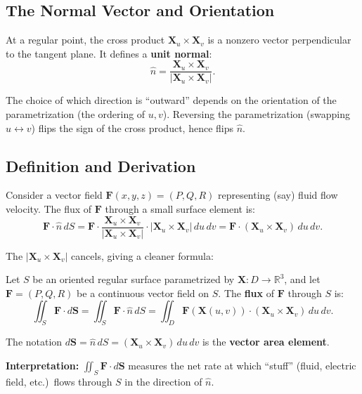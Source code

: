\documentclass[11pt]{report}
\newcommand{\R}{\mathbb{R}}
\begin{document}
\subsection*{The Normal Vector and Orientation}

At a regular point, the cross product $\mathbf{X}_u \times \mathbf{X}_v$ is a nonzero vector perpendicular to the tangent plane. It defines a \textbf{unit normal}:
\[
\hat{n} = \frac{\mathbf{X}_u \times \mathbf{X}_v}{|\mathbf{X}_u \times \mathbf{X}_v|}.
\]

The choice of which direction is ``outward'' depends on the orientation of the parametrization (the ordering of $u, v$). Reversing the parametrization (swapping $u \leftrightarrow v$) flips the sign of the cross product, hence flips $\hat{n}$.

\subsection*{Definition and Derivation}

Consider a vector field $\mathbf{F}(x,y,z) = (P, Q, R)$ representing (say) fluid flow velocity. The flux of $\mathbf{F}$ through a small surface element is:
\[
\mathbf{F} \cdot \hat{n} \, dS = \mathbf{F} \cdot \frac{\mathbf{X}_u \times \mathbf{X}_v}{|\mathbf{X}_u \times \mathbf{X}_v|} \cdot |\mathbf{X}_u \times \mathbf{X}_v| \, du \, dv = \mathbf{F} \cdot (\mathbf{X}_u \times \mathbf{X}_v) \, du \, dv.
\]

The $|\mathbf{X}_u \times \mathbf{X}_v|$ cancels, giving a cleaner formula:

\begin{definition}
Let $S$ be an oriented regular surface parametrized by $\mathbf{X}: D \to \R^3$, and let $\mathbf{F} = (P, Q, R)$ be a continuous vector field on $S$. The \textbf{flux} of $\mathbf{F}$ through $S$ is:
\[
\iint_S \mathbf{F} \cdot d\mathbf{S} = \iint_S \mathbf{F} \cdot \hat{n} \, dS = \iint_D \mathbf{F}(\mathbf{X}(u,v)) \cdot (\mathbf{X}_u \times \mathbf{X}_v) \, du \, dv.
\]

The notation $d\mathbf{S} = \hat{n} \, dS = (\mathbf{X}_u \times \mathbf{X}_v) \, du \, dv$ is the \textbf{vector area element}.
\end{definition}

\textbf{Interpretation:} $\iint_S \mathbf{F} \cdot d\mathbf{S}$ measures the net rate at which ``stuff'' (fluid, electric field, etc.)\ flows through $S$ in the direction of $\hat{n}$.
\end{document}
